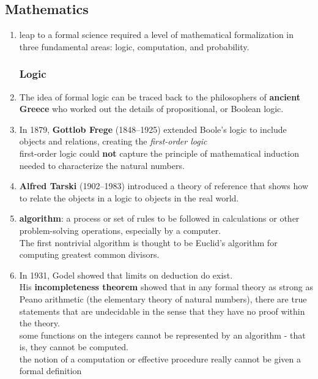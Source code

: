 \subsection{Mathematics}
\begin{enumerate}
    \item leap to a formal science required a level of mathematical formalization in three fundamental areas: logic, computation, and probability.

    \subsubsection*{Logic}

    \item The idea of formal logic can be traced back to the philosophers of \textbf{ancient Greece} who worked out the details of propositional, or Boolean logic.

    \item In 1879, \textbf{Gottlob Frege} (1848–1925) extended Boole’s logic to include objects and relations, creating the \textit{first-order logic}\\
    first-order logic could \textbf{not} capture the principle of mathematical induction needed to characterize the natural numbers.

    \item \textbf{Alfred Tarski} (1902–1983) introduced a theory of reference that shows how to relate the objects in a logic to objects in the real world.

    \item \textbf{algorithm}: a process or set of rules to be followed in calculations or other problem-solving operations, especially by a computer.\\
    The first nontrivial algorithm is thought to be Euclid’s algorithm for computing greatest common divisors.

    \item In 1931, Godel showed that limits on deduction do exist.\\
    His \textbf{incompleteness theorem} showed that in any formal theory as strong as Peano arithmetic (the elementary theory of natural numbers), there are true statements that are undecidable in the sense that they have no proof within the theory. \\
    some functions on the integers cannot be represented by an algorithm - that is, they cannot be computed. \\
    the notion of a computation or effective procedure really cannot be given a formal definition


\end{enumerate}
